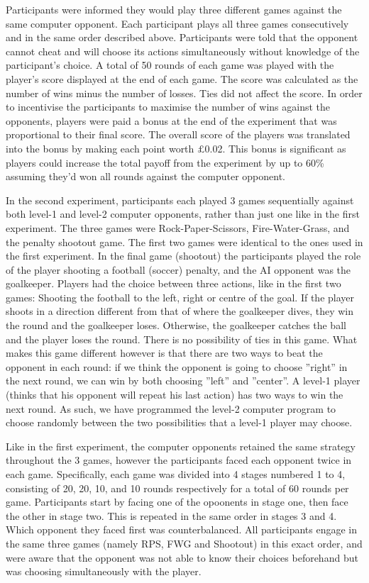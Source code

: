 \documentclass[12pt]{article}         %
\begin{document}
Participants were informed they would play three different games against the same computer opponent. Each participant plays all three games consecutively and in the same order described above. Participants were told that the opponent cannot cheat and will choose its actions simultaneously without knowledge of the participant's choice. A total of 50 rounds of each game was played with the player's score displayed at the end of each game. The score was calculated as the number of wins minus the number of losses. Ties did not affect the score. In order to incentivise the participants to maximise the number of wins against the opponents, players were paid a bonus at the end of the experiment that was proportional to their final score. The overall score of the players was translated into the bonus by making each point worth $£$0.02. This bonus is significant as players could increase the total payoff from the experiment by up to 60\% assuming they'd won all rounds against the computer opponent.


In the second experiment, participants each played 3 games sequentially against both level-1 and level-2 computer opponents, rather than just one like in the first experiment. The three games were Rock-Paper-Scissors, Fire-Water-Grass, and the penalty shootout game. The first two games were identical to the ones used in the first experiment. In the final game (shootout) the participants played the role of the player shooting a football (soccer) penalty, and the AI opponent was the goalkeeper. Players had the choice between three actions, like in the first two games: Shooting the football to the left, right or centre of the goal. If the player shoots in a direction different from that of where the goalkeeper dives, they win the round and the goalkeeper loses. Otherwise, the goalkeeper catches the ball and the player loses the round. There is no possibility of ties in this game. What makes this game different however is that there are two ways to beat the opponent in each round: if we think the opponent is going to choose ''right'' in the next round, we can win by both choosing ''left'' and ''center''. A level-1 player (thinks that his opponent will repeat his last action) has two ways to win the next round. As such, we have programmed the level-2 computer program to choose randomly between the two possibilities that a level-1 player may choose.  

Like in the first experiment, the computer opponents retained the same strategy throughout the 3 games, however the participants faced each opponent twice in each game. Specifically, each game was divided into 4 stages numbered 1 to 4, consisting of 20, 20, 10, and 10 rounds respectively for a total of 60 rounds per game. Participants start by facing one of the opoonents in stage one, then face the other in stage two. This is repeated in the same order in stages 3 and 4. Which opponent they faced first was counterbalanced. All participants engage in the same three games (namely RPS, FWG and Shootout) in this exact order, and were aware that the opponent was not able to know their choices beforehand but was choosing simultaneously with the player. 
\end{document}

